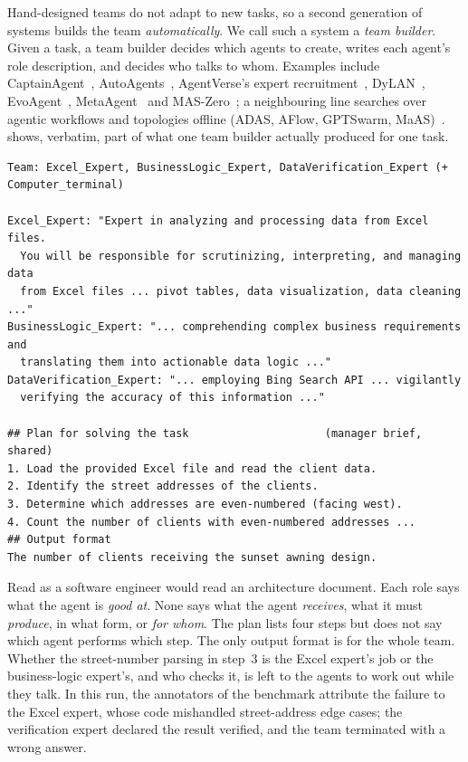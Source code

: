 \documentclass[10pt,a4paper]{article}
\newcommand{\file}[1]{\texttt{#1}}
\begin{document}
Hand-designed teams do not adapt to new tasks, so a second generation of
systems builds the team \emph{automatically}. We call such a system a
\emph{team builder}. Given a task, a team builder decides which agents to
create, writes each agent's role description, and decides who talks to
whom. Examples include CaptainAgent~\cite{song2024captain},
AutoAgents~\cite{chen2024autoagents}, AgentVerse's expert
recruitment~\cite{chen2024agentverse}, DyLAN~\cite{liu2024dylan},
EvoAgent~\cite{yuan2025evoagent}, MetaAgent~\cite{zhang2025metaagent} and
MAS-Zero~\cite{ke2025maszero}; a neighbouring line searches over agentic
workflows and topologies offline (ADAS, AFlow, GPTSwarm,
MaAS)~\cite{hu2025adas,zhang2025aflow,zhuge2024gptswarm,zhang2025maas}.
 shows, verbatim, part of what one team builder actually
produced for one task.

\begin{lstlisting}[style=raw, caption={Raw input: a team specification produced by CaptainAgent for one GAIA task (Who\&When, Algorithm-Generated, file \file{1.json}; role prompts abridged, plan verbatim).}, label={lst:captain}]
Team: Excel_Expert, BusinessLogic_Expert, DataVerification_Expert (+ Computer_terminal)

Excel_Expert: "Expert in analyzing and processing data from Excel files.
  You will be responsible for scrutinizing, interpreting, and managing data
  from Excel files ... pivot tables, data visualization, data cleaning ..."
BusinessLogic_Expert: "... comprehending complex business requirements and
  translating them into actionable data logic ..."
DataVerification_Expert: "... employing Bing Search API ... vigilantly
  verifying the accuracy of this information ..."

## Plan for solving the task                     (manager brief, shared)
1. Load the provided Excel file and read the client data.
2. Identify the street addresses of the clients.
3. Determine which addresses are even-numbered (facing west).
4. Count the number of clients with even-numbered addresses ...
## Output format
The number of clients receiving the sunset awning design.
\end{lstlisting}

Read  as a software engineer would read an architecture
document. Each role says what the agent is \emph{good at}. None says what
the agent \emph{receives}, what it must \emph{produce}, in what form, or
\emph{for whom}. The plan lists four steps but does not say which agent
performs which step. The only output format is for the whole team. Whether
the street-number parsing in step~3 is the Excel expert's job or the
business-logic expert's, and who checks it, is left to the agents to work
out while they talk. In this run, the annotators of the benchmark attribute
the failure to the Excel expert, whose code mishandled street-address edge
cases; the verification expert declared the result verified, and the team
terminated with a wrong answer.
\end{document}
